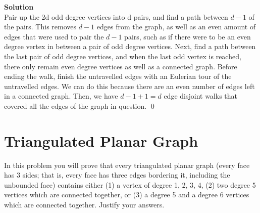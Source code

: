 \documentclass[11pt]{article}
\newcommand*{\Question}[1]{\section{#1}}
\newenvironment{Parts}{\begin{enumerate}[label=(\alph*)]}{\end{enumerate}}
\begin{document}
\begin{Parts}
\begin{mdframed} \textbf{Solution} \\
Pair up the 2d odd degree vertices into d pairs, and find a path between $d-1$ of the pairs. This removes $d-1$ edges from the graph, as well as an even amount of edges that were used to pair the $d-1$ pairs, such as if there were to be an even degree vertex in between a pair of odd degree vertices. Next, find a path between the last pair of odd degree vertices, and when the last odd vertex is reached, there only remain even degree vertices as well as a connected graph. Before ending the walk, finish the untravelled edges with an Eulerian tour of the untravelled edges. We can do this because there are an even number of edges left in a connected graph. Then, we have $d-1+1=d$ edge disjoint walks that covered all the edges of the graph in question. \qed
\end{mdframed}

\end{Parts}

\pagebreak

\Question {Triangulated Planar Graph}
In this problem you will prove that every triangulated planar graph (every face has 3 sides; that is, every face has three edges bordering it, including the unbounded face)
contains either (1) a vertex of degree 1, 2, 3, 4, (2) two degree 5 vertices 
which are connected together, or (3) a degree 5 and a degree 6 vertices which are 
connected together. Justify your answers.
\end{document}
